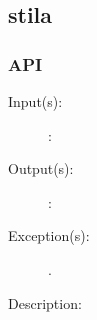 %
%
%
%
%              

\subsection{stila}
\label{stila}

\subsubsection{API}
\begin{description}
\label{stila_}
\item[{\cfunc[]{stila\_}{}}: ]
	\begin{description}\item[]
	\item[Input(s): ]
		\begin{description}\item[]
		\item[: ]
		\end{description}
	\item[Output(s): ]
		\begin{description}\item[]
		\item[: ]
		\end{description}
	\item[Exception(s): ]
		\begin{description}\item[]
		\item[.]
		\end{description}
	\item[Description: ]
	\end{description}
\end{description}

